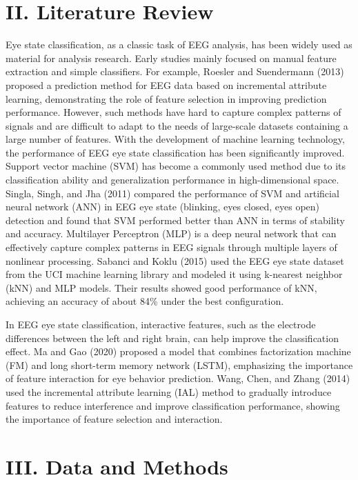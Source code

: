 \documentclass[
  doc]{apa6}
\begin{document}
\section{II. Literature Review}\label{ii.-literature-review}

Eye state classification, as a classic task of EEG analysis, has been widely used as material for analysis research. Early studies mainly focused on manual feature extraction and simple classifiers. For example, Roesler and Suendermann (2013) proposed a prediction method for EEG data based on incremental attribute learning, demonstrating the role of feature selection in improving prediction performance. However, such methods have hard to capture complex patterns of signals and are difficult to adapt to the needs of large-scale datasets containing a large number of features. With the development of machine learning technology, the performance of EEG eye state classification has been significantly improved. Support vector machine (SVM) has become a commonly used method due to its classification ability and generalization performance in high-dimensional space. Singla, Singh, and Jha (2011) compared the performance of SVM and artificial neural network (ANN) in EEG eye state (blinking, eyes closed, eyes open) detection and found that SVM performed better than ANN in terms of stability and accuracy. Multilayer Perceptron (MLP) is a deep neural network that can effectively capture complex patterns in EEG signals through multiple layers of nonlinear processing. Sabanci and Koklu (2015) used the EEG eye state dataset from the UCI machine learning library and modeled it using k-nearest neighbor (kNN) and MLP models. Their results showed good performance of kNN, achieving an accuracy of about 84\% under the best configuration.

In EEG eye state classification, interactive features, such as the electrode differences between the left and right brain, can help improve the classification effect. Ma and Gao (2020) proposed a model that combines factorization machine (FM) and long short-term memory network (LSTM), emphasizing the importance of feature interaction for eye behavior prediction. Wang, Chen, and Zhang (2014) used the incremental attribute learning (IAL) method to gradually introduce features to reduce interference and improve classification performance, showing the importance of feature selection and interaction.

\section{III. Data and Methods}\label{iii.-data-and-methods}
\end{document}
